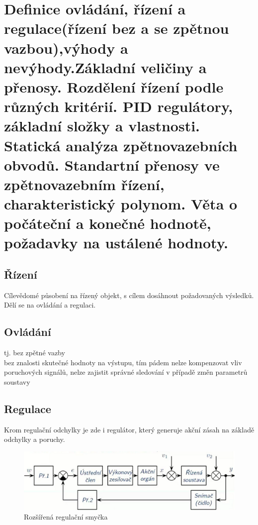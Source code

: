 \section{Definice ovládání, řízení a regulace(řízení bez a se zpětnou vazbou),výhody a nevýhody.Základní veličiny a přenosy. Rozdělení řízení podle různých kritérií. PID regulátory, základní složky a vlastnosti. Statická analýza zpětnovazebních obvodů. Standartní přenosy ve zpětnovazebním řízení, charakteristický polynom. Věta o počáteční a konečné hodnotě, požadavky na ustálené hodnoty.}
\subsection*{Řízení}
Cílevědomé působení na řízený objekt, s cílem dosáhnout požadovaných výsledků. Dělí se na ovládání a regulaci.

\subsection*{Ovládání}
tj. bez zpětné vazby\\
bez znalosti skutečné hodnoty na výstupu, tím pádem nelze kompenzovat vliv poruchových signálů, nelze zajistit správné sledování v případě změn parametrů soustavy\\

\subsection*{Regulace}
Krom regulační odchylky je zde i regulátor, který generuje akční zásah na základě odchylky a poruchy.
\begin{figure}[H]
    \includegraphics[scale = 0.45]{images/reg.soustava.png}
    \caption{Rozšířená regulační smyčka}
\end{figure}

